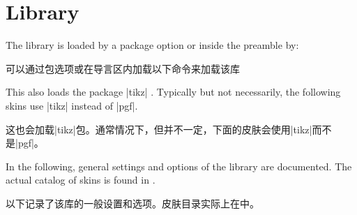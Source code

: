\section{Library }\label{sec:skins}%
%
The library is loaded by a package option or inside the preamble by:
 
可以通过包选项或在导言区内加载以下命令来加载该库
\begin{dispListing}
\end{dispListing}
This also loads the package |tikz| . Typically but not necessarily,
the following skins use |tikz| instead of |pgf|.

这也会加载|tikz|包。通常情况下，但并不一定，下面的皮肤会使用|tikz|而不是|pgf|。

In the following, general settings and options of the library are
documented.
The actual catalog of skins is found in .

以下记录了该库的一般设置和选项。皮肤目录实际上在中。